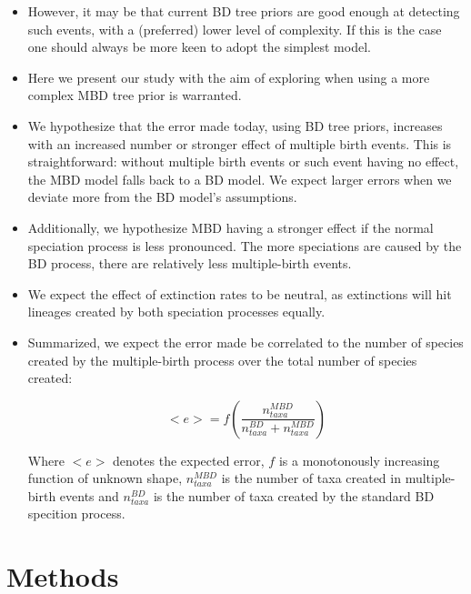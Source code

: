 \documentclass{article}
\begin{document}
\begin{itemize}
\item However, it may be that current BD tree priors are good enough 
at detecting such events, with a (preferred) lower level of complexity. 
If this is the case one should always be more keen to adopt the simplest model.

\item Here we present our study with the aim of exploring 
when using a more complex MBD tree prior is warranted.

\item We hypothesize that the error made today, using BD tree priors,
increases with an increased number or stronger effect of multiple birth events.
This is straightforward: without multiple birth events or such event having
no effect, the MBD model falls back to a BD model. We expect larger
errors when we deviate more from the BD model's assumptions. 

\item Additionally, we hypothesize MBD having a stronger effect if the normal
speciation process is less pronounced. The more speciations are caused by the
BD process, there are relatively less multiple-birth events. 

\item We expect the effect of extinction rates to be neutral, as extinctions will
hit lineages created by both speciation processes equally. 

\item Summarized, we expect the error made be correlated to the number 
of species created by the multiple-birth process over the total number 
of species created:

\begin{equation}
<e> = f(\frac{n_{taxa}^{MBD}}{n_{taxa}^{BD} + n_{taxa}^{MBD}})
\end{equation} 

Where $<e>$ denotes the expected error, $f$ is a monotonously increasing 
function of unknown shape, $n_{taxa}^{MBD}$ is the number of taxa created
in multiple-birth events and $n_{taxa}^{BD}$ is the number of taxa created
by the standard BD specition process.

\end{itemize}

\section{Methods}
\end{document}
